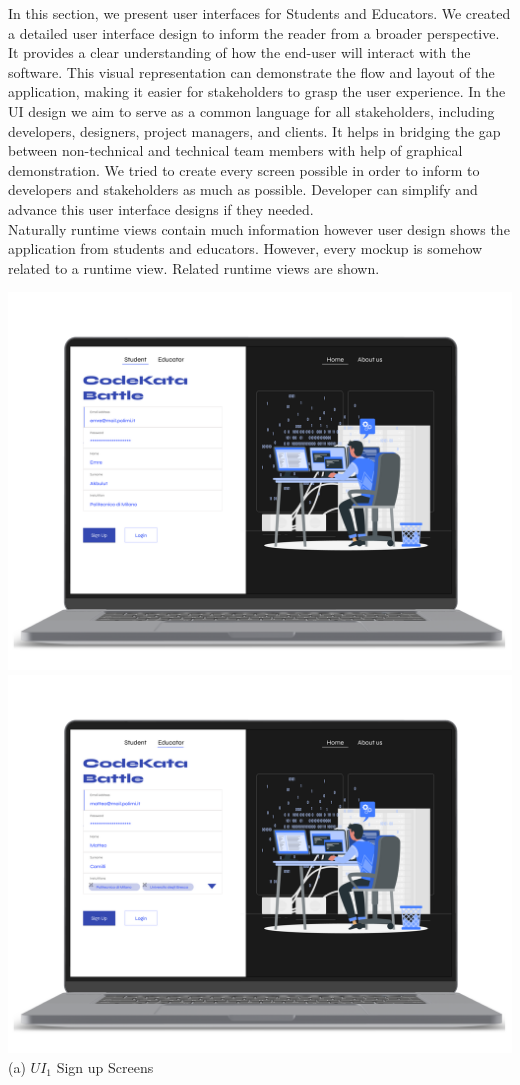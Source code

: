 In this section, we present user interfaces for Students and Educators. We created a detailed user interface design to inform the reader from a broader perspective.  It provides a clear understanding of how the end-user will interact with the software. This visual representation can demonstrate the flow and layout of the application, making it easier for stakeholders to grasp the user experience. In the UI design we aim to serve as a common language for all stakeholders, including developers, designers, project managers, and clients. It helps in bridging the gap between non-technical and technical team members with help of graphical demonstration. We tried to create every screen possible in order to inform to developers and stakeholders as much as possible. Developer can simplify and advance this user interface designs if they needed.
\\
Naturally runtime views contain much information however user design shows the application from students and educators. However, every mockup is somehow related to a runtime view. Related runtime views are shown.

\begin{center}
    \includegraphics[scale=0.13]{Images/ui-ux/student_signup.png}
    \includegraphics[scale=0.13]{Images/ui-ux/educator_signup.png}
    (a) $UI_{1}$ Sign up Screens 
\end{center}

